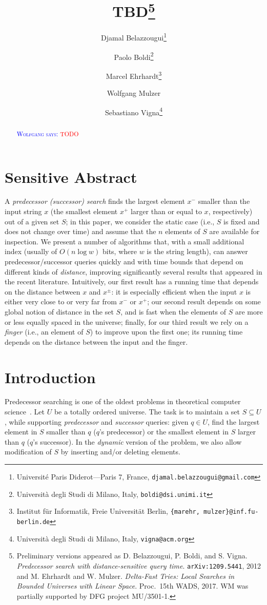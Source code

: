 \documentclass[a4paper,11pt]{article}
\title{TBD\footnote{
Preliminary versions appeared as 
D. Belazzougui, P. Boldi, and S. Vigna. 
\emph{Predecessor search with distance-sensitive query
time}. \texttt{arXiv:1209.5441}, 2012
and 
M. Ehrhardt and W. Mulzer.  \emph{Delta-Fast Tries: Local 
Searches in Bounded Universes with Linear Space}. Proc.~15th WADS,
2017.  WM was partially 
supported by DFG project MU/3501-1.}}
\author{Djamal Belazzougui\thanks{Universit\'e Paris 
        Diderot---Paris 7, France,
        \texttt{djamal.belazzougui@gmail.com}}
        \and
        Paolo Boldi\thanks{Universit\`a degli Studi di Milano, Italy, 
	\texttt{boldi@dsi.unimi.it}}
        \and
        Marcel Ehrhardt\thanks{Institut f\"ur Informatik, Freie 
	Universit\"at Berlin,
        \texttt{\{marehr, mulzer\}@inf.fu-berlin.de}}
        \and 
        Wolfgang Mulzer\footnotemark[4]
        \and 
        Sebastiano Vigna\thanks{Universit\`a 
	degli Studi di Milano, Italy, 
	\texttt{vigna@acm.org}}
        }
\date{}
\newcommand{\?}{\mskip1.5mu}
\newcommand{\aremark}[3]{\textcolor{blue}{\textsc{#1 #2:}}
  \textcolor{red}{\textsf{#3}}}
\newcommand{\wolfgang}[2][says]{\aremark{Wolfgang}{#1}{#2}}
\begin{document}
\maketitle

\begin{abstract}
\wolfgang{TODO}
\end{abstract}

\section{Sensitive Abstract}
A \emph{predecessor (successor) search} finds the largest element $x^-$ smaller
than the input string $x$ (the smallest element $x^+$ larger than or equal to
$x$, respectively) out of a given set $S$; in this paper, we consider
the static case (i.e., $S$ is fixed and does not change over time) and assume that
the $n$ elements of $S$ are available for inspection. We present a number of
algorithms that, with a small additional index (usually of $O(n\log w)$ bits,
where $w$ is the string length), can answer predecessor/successor queries
quickly and with time bounds that depend on different kinds of \emph{distance},
improving significantly several results that appeared in the recent literature.
Intuitively, our first result has a running time that depends on the distance
between $x$ and $x^\pm$: it is especially efficient when the input $x$ is
either very close to or very far from $x^-$ or $x^+$; our second result depends on some global notion of distance in the set $S$,
and is fast when the elements of $S$ are more or less equally spaced in the universe; finally, for our third result
we rely on a \emph{finger} (i.e., an element of $S$) to improve upon the first
one; its running time depends on the distance between the input and the
finger.

\section{Introduction}

Predecessor searching is one of the oldest problems in 
theoretical computer science~\cite{CormenLeRiSt09,Knuth98}.
Let $U$ be a totally ordered universe. The task is to 
maintain a set $S \subseteq U$, while supporting
\emph{predecessor} and \emph{successor} queries: 
given $q \in U$, find the largest element in $S$ 
smaller than $q$ ($q$'s predecessor) or the smallest 
element in $S$ larger than $q$ ($q$'s successor). 
In the \emph{dynamic} version of the problem, we also 
allow modification of $S$ by inserting and/or deleting 
elements.
\end{document}

